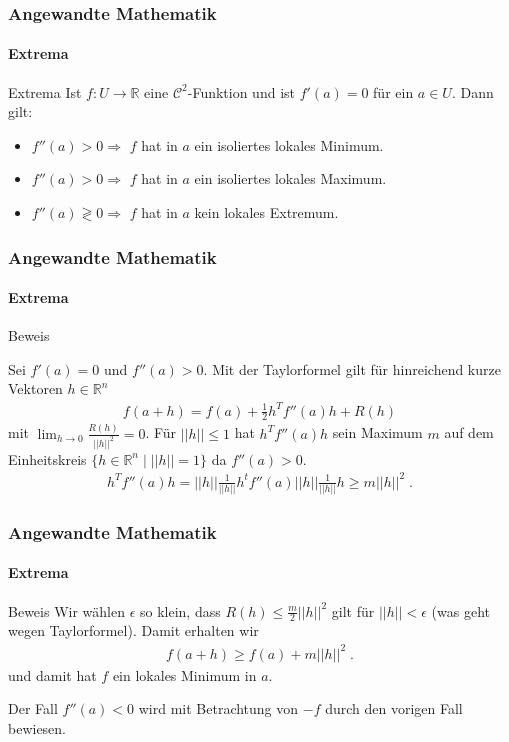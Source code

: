 \documentclass{beamer}
\begin{document}
\begin{frame}
    \frametitle{Angewandte Mathematik}
\framesubtitle{Extrema}
    \begin{block}{Extrema}
 Ist $f: U  \to \mathbb{R}$ eine $\mathcal{C}^2$-Funktion und ist $f'(a) = 0$ für ein $a \in U$. Dann gilt:
\begin{itemize}
\item $f''(a) > 0 \Rightarrow $ $f$ hat in $a$ ein isoliertes lokales Minimum.
\item $f''(a) > 0 \Rightarrow $ $f$ hat in $a$ ein isoliertes lokales Maximum.
\item $f''(a) \gtrless 0 \Rightarrow $ $f$ hat in $a$ kein lokales Extremum.
\end{itemize} 
\end{block}
 \end{frame}


\begin{frame}
    \frametitle{Angewandte Mathematik}
\framesubtitle{Extrema}
    \begin{block}{Beweis}

Sei $f'(a) = 0$ und $f''(a) > 0$. Mit der Taylorformel gilt für hinreichend kurze Vektoren $h \in \mathbb{R}^n$
\begin{align*}
f(a + h) = f(a) + \frac{1}{2} h^T f''(a) h + R(h)
\end{align*}
mit $\lim_{h \to 0} \frac{R(h)}{ ||h||^2} = 0$. Für $||h|| \leq 1$ hat $ h^T f''(a) h $ sein Maximum $m$ auf dem Einheitskreis $\{ h \in \mathbb{R}^n \; | \; ||h|| = 1 \}$ da $f''(a) > 0$.
\begin{align*}
 h^T f''(a) h  = ||h|| \frac{1}{||h||} h^t  f''(a)  ||h|| \frac{1}{||h||} h \geq m ||h||^2 \;.
\end{align*}
\end{block}
 \end{frame}



\begin{frame}
    \frametitle{Angewandte Mathematik}
\framesubtitle{Extrema}
    \begin{block}{Beweis}
Wir wählen $\epsilon$ so klein, dass $R(h) \leq \frac{m}{2}  ||h||^2$ gilt für $||h|| < \epsilon$  (was geht wegen Taylorformel).
Damit erhalten wir
\begin{align*}
f(a + h) \geq f(a) +  m ||h||^2 \;.
\end{align*}
und damit hat $f$ ein lokales Minimum in $a$.

Der Fall $f''(a) < 0$ wird mit Betrachtung von $-f$ durch den vorigen Fall bewiesen.
\end{block}
 \end{frame}
\end{document}
